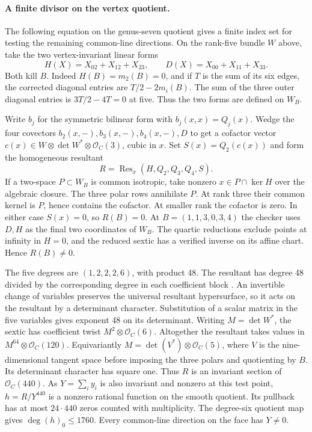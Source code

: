 \paragraph{A finite divisor on the vertex quotient.}
The following equation on the genus-seven quotient gives a finite
index set for testing the remaining common-line directions. On the
rank-five bundle \(W\) above, take the two vertex-invariant linear forms
\[
 H(X)=X_{02}+X_{12}+X_{23},\qquad D(X)=X_{00}+X_{11}+X_{33}.
\]
Both kill \(B\). Indeed \(H(B)=m_2(B)=0\), and if \(T\) is the sum of its
six edges, the corrected diagonal entries are \(T/2-2m_i(B)\).
The sum of the three outer diagonal entries is \(3T/2-4T=0\) at five.
Thus the two forms are defined on \(W_B\).

Write \(b_j\) for the symmetric bilinear form with
\(b_j(x,x)=Q_j(x)\). Wedge the four covectors
\(b_2(x,-), b_3(x,-), b_4(x,-), D\) to get a cofactor vector
\(c(x)\in W\otimes\det W^*\otimes\mathcal O_C(3)\), cubic in \(x\).
Set \(S(x)=Q_2(c(x))\) and form the homogeneous resultant
\[
         R=\operatorname{Res}_x(H,Q_2,Q_3,Q_4,S).
\]
If a two-space \(P\subset W_B\) is common isotropic, take nonzero
\(x\in P\cap\ker H\) over the algebraic closure. The three polar rows
annihilate \(P\). At rank three their common kernel is \(P\), hence
contains the cofactor. At smaller rank the cofactor is zero. In either
case \(S(x)=0\), so \(R(B)=0\). At \(B=(1,1,3,0,3,4)\) the checker uses
\(D,H\) as the final two coordinates of \(W_B\). The quartic reductions
exclude points at infinity in \(H=0\), and the reduced sextic has a
verified inverse on its affine chart. Hence \(R(B)\ne0\).

The five degrees are \((1,2,2,2,6)\), with product 48. The resultant
has degree 48 divided by the corresponding degree in each coefficient
block \cite{dandreaDickensteinResultant}. An invertible change of
variables preserves the universal resultant hypersurface, so it acts on
the resultant by a determinant character. Substitution of a scalar
matrix in the five variables gives exponent 48 on its determinant.
Writing \(M=\det W^*\), the sextic
has coefficient twist \(M^2\otimes\mathcal O_C(6)\). Altogether the
resultant takes values in \(M^{64}\otimes\mathcal O_C(120)\).
Equivariantly \(M=\det(V^*)\otimes\mathcal O_C(5)\), where \(V\) is the
nine-dimensional tangent space before imposing the three polars and
quotienting by \(B\). Its determinant character has square one.
Thus \(R\) is an invariant section of \(\mathcal O_C(440)\).
As \(Y=\sum_i y_i\) is also invariant and nonzero at this test point,
\(h=R/Y^{440}\) is a nonzero rational function on the smooth quotient.
Its pullback has at most \(24\cdot440\) zeros counted with multiplicity.
The degree-six quotient map gives \(\deg (h)_0\le 1760\).
Every common-line direction on the face has \(Y\ne0\).


